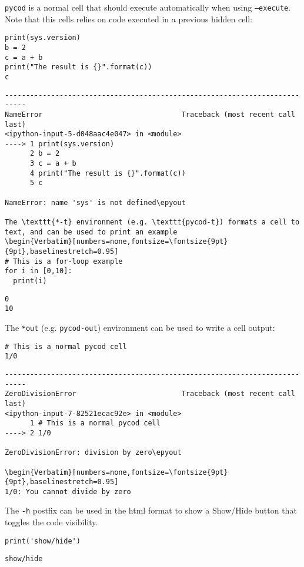\documentclass[%
oneside,                 %
final,                   %
chapterprefix=true,      %
open=right,              %
10pt]{book}
\begin{document}
\texttt{pycod} is a normal cell that should execute automatically when using \texttt{--execute}. Note that this cells relies on code executed in a previous hidden cell:
\begin{Verbatim}[numbers=none,fontsize=\fontsize{9pt}{9pt},baselinestretch=0.95]
print(sys.version)
b = 2
c = a + b
print("The result is {}".format(c))
c
\end{Verbatim}
\begin{Verbatim}[numbers=none,fontsize=\fontsize{9pt}{9pt},baselinestretch=0.95]
---------------------------------------------------------------------------
NameError                                 Traceback (most recent call last)
<ipython-input-5-d048aac4e047> in <module>
----> 1 print(sys.version)
      2 b = 2
      3 c = a + b
      4 print("The result is {}".format(c))
      5 c

NameError: name 'sys' is not defined\epyout

The \texttt{*-t} environment (e.g. \texttt{pycod-t}) formats a cell to text, and can be used to print an example
\begin{Verbatim}[numbers=none,fontsize=\fontsize{9pt}{9pt},baselinestretch=0.95]
# This is a for-loop example
for i in [0,10]:
  print(i)
\end{Verbatim}
\begin{Verbatim}[numbers=none,fontsize=\fontsize{9pt}{9pt},baselinestretch=0.95]
0
10
\end{Verbatim}

The \texttt{*out}  (e.g. \texttt{pycod-out}) environment can be used to write a cell output:
\begin{Verbatim}[numbers=none,fontsize=\fontsize{9pt}{9pt},baselinestretch=0.95]
# This is a normal pycod cell
1/0
\end{Verbatim}
\begin{Verbatim}[numbers=none,fontsize=\fontsize{9pt}{9pt},baselinestretch=0.95]
---------------------------------------------------------------------------
ZeroDivisionError                         Traceback (most recent call last)
<ipython-input-7-82521ecac92e> in <module>
      1 # This is a normal pycod cell
----> 2 1/0

ZeroDivisionError: division by zero\epyout

\begin{Verbatim}[numbers=none,fontsize=\fontsize{9pt}{9pt},baselinestretch=0.95]
1/0: You cannot divide by zero
\end{Verbatim}

The \texttt{-h} postfix can be used in the html format to show a Show/Hide button that toggles the code visibility. 
\begin{Verbatim}[numbers=none,fontsize=\fontsize{9pt}{9pt},baselinestretch=0.95]
print('show/hide')
\end{Verbatim}
\begin{Verbatim}[numbers=none,fontsize=\fontsize{9pt}{9pt},baselinestretch=0.95]
show/hide
\end{Verbatim}
\end{document}
